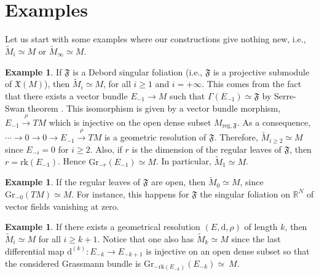 \documentclass[10pt]{article}
\theoremstyle{plain}
\theoremstyle{definition}
\newtheorem{example}[lemma]{Example}
\theoremstyle{remark}
\newcommand{\dd}{\mathrm{d}}
\begin{document}
\section{Examples}\label{sec:Examples}
Let us start with some examples where our constructions give nothing new, i.e., $\widetilde M_i\simeq M$ or $\widetilde M_\infty\simeq M$.
\begin{example}\label{ex1}
If $\mathfrak{F}$ is a Debord singular foliation (i.e., $\mathfrak F$ is a projective submodule of $\mathfrak X(M)$), then $\widetilde M_i\simeq M$, for all $i\geq 1$ and $i=+\infty$. This comes from the fact that there exists a vector bundle $E_{-1}\longrightarrow M$ such that $\Gamma(E_{-1})\simeq \mathfrak{F}$ by Serre-Swan theorem \cite{SwanRichardG, MoryeArchanaS}. This isomorphism is given by a vector bundle morphism, $E_{-1}\stackrel{\rho}{\rightarrow}TM$ which is injective on the open dense subset $M_{\mathrm{reg}, \mathfrak  F}$. As a consequence,  $\cdots\rightarrow 0\rightarrow 0\rightarrow E_{-1}\stackrel{\rho}{\rightarrow}TM$ is a geometric resolution of $\mathfrak F$. Therefore, $\widetilde M_{i\geq 2}\simeq M$ since $E_{-i}=0$ for $i\geq 2$. Also, if $r$ is the dimension of the regular leaves of $\mathfrak F$, then  $r=\mathrm{rk}(E_{-1})$. Hence $\mathrm{Gr}_{-r}(E_{-1})\simeq M$. In particular, $\widetilde M_1\simeq M$.\end{example}

\begin{example}\label{ex2}
      If the regular leaves of $\mathfrak{F}$ are  open, then ${\widetilde M}_0\simeq M$, since $\mathrm{Gr}_{-0}(TM)\simeq M$. For instance, this happens for $\mathfrak F$  the singular foliation on $\mathbb R^N$ of vector fields vanishing at zero.
 \end{example}


 \begin{example}\label{ex3}
    If there exists a geometrical resolution $(E, \dd, \rho)$ of length $k$, then $\widetilde M_i\simeq M$ for all $i\geq k+1$. Notice that one also has $\widetilde M_k\simeq M$ since the last differential map $\dd^{(k)}\colon E_{-k}\longrightarrow E_{-k+1}$ is injective on an open dense subset so that the considered Grassmann bundle is $\mathrm{Gr}_{-\mathrm{rk}(E_{-k})}(E_{-k})\simeq~M$.

\end{example}

\end{document}
